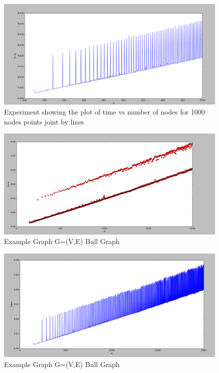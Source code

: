 \begin{figure}[H]
\centering
\includegraphics[scale=0.3]{e1000b.png}
\caption{Experiment showing the plot of time vs number of nodes for 1000 nodes points joint by lines}
\end{figure}

\begin{figure}[H]
\centering
\includegraphics[scale=0.3]{e2000.png}
\caption{Example Graph G=(V,E) Bull Graph}
\end{figure}

\begin{figure}[H]
\centering
\includegraphics[scale=0.3]{e2000b.png}
\caption{Example Graph G=(V,E) Bull Graph}
\end{figure}


